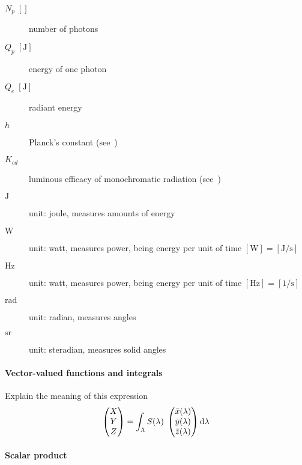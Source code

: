 \begin{description}
\item[ {$N_p\;[]$} ] number of photons
\item[ {$Q_p\;[\unit\joule]$} ] energy of one photon
\item[ {$Q_e\;[\unit\joule]$} ] radiant energy


\item[ {$h$} ] Planck's constant (see~\cite{bipm:si.2019})
\item[ {$K_{cd}$} ] luminous efficacy of monochromatic radiation (see~\cite{bipm:si.2019})

\item[ {$\unit\joule$} ] unit: joule, measures amounts of energy
\item[ {$\unit\watt$} ] unit: watt, measures power, being energy per 
	unit of time $[\unit\watt] = [\unit{\joule\per\second}]$
\item[ {$\unit\hertz$} ] unit: watt, measures power, being energy per 
	unit of time $[\unit\hertz] = [\unit{1\per\second}]$
\item[ {$\unit\radian$} ] 	unit: radian, measures angles
\item[ {$\unit\steradian$} ] unit: steradian, measures solid angles
                   
\end{description}

\paragraph{Vector-valued functions and integrals}

\begin{inconstruction}
	Explain the meaning of this expression
	\begin{displaymath}
		\begin{pmatrix}X\\Y\\Z\end{pmatrix}
		= \int_\Lambda S(\lambda)\; 
		\begin{pmatrix}
			\bar x(\lambda)\\
			\bar y(\lambda)\\
			\bar z(\lambda)
		\end{pmatrix}
		\mathop{}\!\mathrm{d}\lambda
	\end{displaymath}
\end{inconstruction}


\paragraph{Scalar product}

